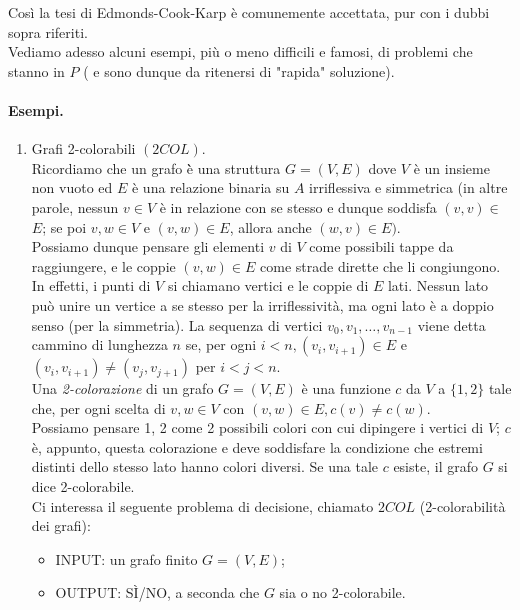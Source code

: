 Così la tesi di Edmonds-Cook-Karp è comunemente accettata, pur con i dubbi sopra riferiti.\\
Vediamo adesso alcuni esempi, più o meno difficili e famosi, di problemi che stanno in $P$ ( e sono dunque da ritenersi di "rapida" soluzione).

\paragraph{Esempi.}
\begin{enumerate}
    \item Grafi 2-colorabili $(2 C O L)$.\\
          Ricordiamo che un grafo è̀ una struttura $G=(V, E)$ dove $V$ è un
          insieme non vuoto ed $E$ è una relazione binaria su $A$ irriflessiva e
          simmetrica (in altre parole, nessun $v \in V$ è in relazione con se
          stesso e dunque soddisfa $(v, v) \in$ $E$; se poi $v, w \in V$ e $(v,
              w) \in E$, allora anche $(w, v) \in E)$.\\
          Possiamo dunque pensare gli elementi $v$ di $V$ come possibili tappe
          da raggiungere, e le coppie $(v, w) \in E$ come strade dirette che li
          congiungono. In effetti,
          i punti di $V$ si chiamano vertici e le coppie di $E$ lati. Nessun
          lato può unire un vertice a se stesso per la irriflessività, ma ogni
          lato è a doppio senso (per la simmetria). La sequenza di vertici $v_0,
              v_1, \ldots, v_{n-1}$ viene detta cammino di lunghezza $n$ se, per
          ogni $i<n,\left(v_i, v_{i+1}\right) \in E$ e $\left(v_i,
              v_{i+1}\right) \neq\left(v_j, v_{j+1}\right)$ per $i<j<n$.\\
          Una \textit{2-colorazione} di un grafo $G=(V, E)$ è una funzione $c$ da $V$ a
          $\{1,2\}$ tale che, per ogni scelta di $v, w \in V$ con $(v, w) \in E, c(v) \neq
              c(w)$.\\
          Possiamo pensare 1, 2 come 2 possibili colori con cui dipingere i vertici di
          $V$; $c$ è, appunto, questa colorazione e deve soddisfare la condizione che
          estremi distinti dello stesso lato hanno colori diversi. Se una tale $c$ esiste,
          il grafo $G$ si dice 2-colorabile.\\
          Ci interessa il seguente problema di decisione, chiamato $2 C O L$
          (2-colorabilità dei grafi):

          \begin{itemize}
              \item INPUT: un grafo finito $G=(V, E)$;
              \item OUTPUT: SÌ/NO, a seconda che $G$ sia o no 2-colorabile.
          \end{itemize}


\end{enumerate}
